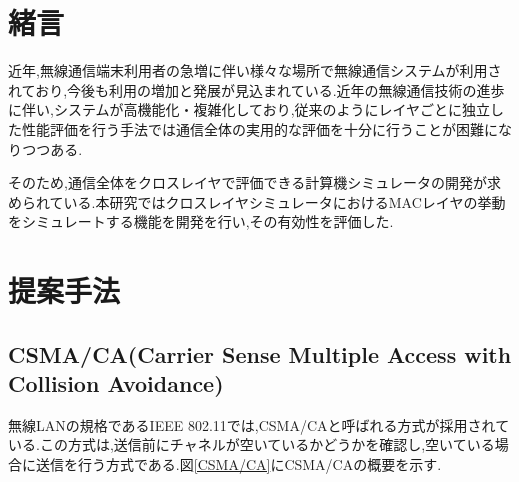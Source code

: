 \documentclass[a4paper, 10pt]{ltjsarticle}
\begin{document}
\setlength{\columnsep}{7.5mm}

\twocolumn[
    \begin{center}
        {\vspace{-1em}}

        {\fontsize{15pt}{15pt}\selectfont{クロスレイヤシミュレータ開発における無線LANシミュレータの開発}}

        {\vspace{1.3em}}

        {\fontsize{13pt}{13pt}\selectfont{Development of a Wireless LAN Simulator for Cross-Layer Simulator Development }}
    \end{center}

    \vspace{0.1em}

    \begin{flushright}
      {\fontsize{11pt}{11pt}\selectfont{T5-16 \; 下沢亮太郎\\}}
      {\fontsize{11pt}{11pt}\selectfont{指導教員 \; 設樂勇}}
    \end{flushright}

    \vspace{1em}

    \thispagestyle{empty}
]

\section{緒言}
近年,無線通信端末利用者の急増に伴い様々な場所で無線通信システムが利用されており,今後も利用の増加と発展が見込まれている.近年の無線通信技術の進歩に伴い,システムが高機能化・複雑化しており,従来のようにレイヤごとに独立した性能評価を行う手法では通信全体の実用的な評価を十分に行うことが困難になりつつある.

そのため,通信全体をクロスレイヤで評価できる計算機シミュレータの開発が求められている.本研究ではクロスレイヤシミュレータにおけるMACレイヤの挙動をシミュレートする機能を開発を行い,その有効性を評価した.


\section{提案手法}

\subsection{CSMA/CA(Carrier Sense Multiple Access with Collision Avoidance)}
無線LANの規格であるIEEE 802.11では,CSMA/CAと呼ばれる方式が採用されている.この方式は,送信前にチャネルが空いているかどうかを確認し,空いている場合に送信を行う方式である.図\ref{CSMA/CA}にCSMA/CAの概要を示す.
\end{document}
